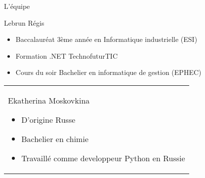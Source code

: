 \begin{frame}{L'équipe}
\begin{minipage}{0.45\textwidth}
Lebrun Régis
\begin{itemize}
  \item Baccalauréat 3ème année en Informatique industrielle (ESI)
  \item Formation .NET TechnofuturTIC
  \item Cours du soir Bachelier en informatique de gestion (EPHEC)
\end{itemize}
\end{minipage}%
\hfill
\begin{minipage}{0.45\textwidth}
\begin{tabular}{|p{\textwidth}}
Ekatherina Moskovkina
\begin{itemize}
\item D'origine Russe
\item Bachelier en chimie
\item Travaillé comme developpeur Python en Russie
\end{itemize}
\end{tabular}
\end{minipage}%
\end{frame}